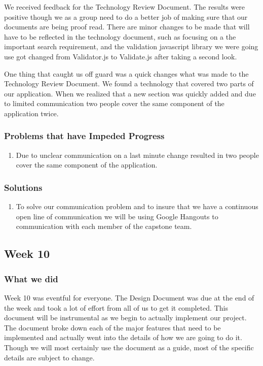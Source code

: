 \documentclass[letterpaper,10pt,titlepage, onecolumn, compsoc]{IEEEtran}
\begin{document}
We received feedback for the Technology Review Document. The results were positive though we as a group need to do a better job of making sure that our documents are being proof read. There are minor changes to be made that will have to be reflected in the technology document, such as focusing on a the important search requirement, and the validation javascript library we were going use got changed from Validator.js to Validate.js after taking a second look.

One thing that caught us off guard was a quick changes what was made to the Technology Review Document. We found a technology that covered two parts of our application. When we realized that a new section was quickly added and due to limited communication two people cover the same component of the application twice.  

\subsubsection{Problems that have Impeded Progress}
\begin{enumerate}
	\item Due to unclear communication on a last minute change resulted in two people cover the same component of the application. 
\end{enumerate}

\subsubsection{Solutions}
\begin{enumerate}
	\item To solve our communication problem and to insure that we have a continuous open line of communication we will be using Google Hangouts to communication with each member of the capstone team. 
\end{enumerate}

\subsection{Week 10}

\subsubsection{What we did}
Week 10 was eventful for everyone. The Design Document was due at the end of the week and took a lot of effort from all of us to get it completed. This document will be instrumental as we begin to actually implement our project. The document broke down each of the major features that need to be implemented and actually went into the details of how we are going to do it. Though we will most certainly use the document as a guide, most of the specific details are subject to change. 
\end{document}
